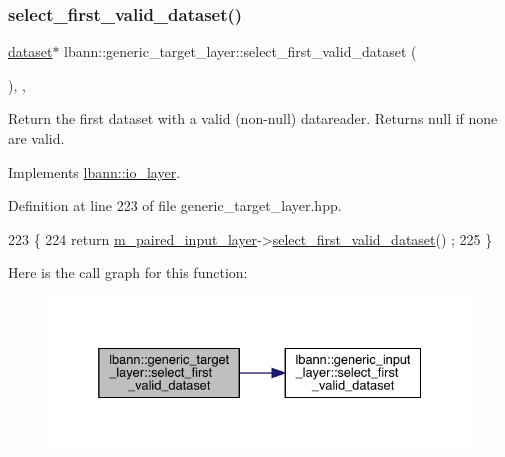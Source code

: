 \subsubsection{\texorpdfstring{select\+\_\+first\+\_\+valid\+\_\+dataset()}{select\_first\_valid\_dataset()}}
{\footnotesize\ttfamily \hyperlink{classlbann_1_1dataset}{dataset}$\ast$ lbann\+::generic\+\_\+target\+\_\+layer\+::select\+\_\+first\+\_\+valid\+\_\+dataset (\begin{DoxyParamCaption}{ }\end{DoxyParamCaption})\hspace{0.3cm}{\ttfamily [inline]}, {\ttfamily [override]}, {\ttfamily [virtual]}}

Return the first dataset with a valid (non-\/null) datareader. Returns null if none are valid. 

Implements \hyperlink{classlbann_1_1io__layer_a7dbc671fd5a81094854a4d865f7631ce}{lbann\+::io\+\_\+layer}.



Definition at line 223 of file generic\+\_\+target\+\_\+layer.\+hpp.


\begin{DoxyCode}
223                                                  \{
224     \textcolor{keywordflow}{return} \hyperlink{classlbann_1_1generic__target__layer_a84da1260e9feb4fbc3e6f2315e4cab4b}{m\_paired\_input\_layer}->\hyperlink{classlbann_1_1generic__input__layer_a777aa11816a518098212408b569b6fb8}{select\_first\_valid\_dataset}()
      ;
225   \}
\end{DoxyCode}
Here is the call graph for this function\+:\nopagebreak
\begin{figure}[H]
\begin{center}
\leavevmode
\includegraphics[width=332pt]{classlbann_1_1generic__target__layer_a22374687112c04dd6e0e35b94fe0e46c_cgraph}
\end{center}
\end{figure}
\mbox{\label{classlbann_1_1generic__target__layer_a1f8f722fadb1223b063c0917afd83b66}} 
